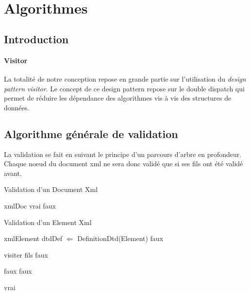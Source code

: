 \section{Algorithmes}

\subsection*{Introduction}
\paragraph{Visitor}
La totalité de notre conception repose en grande partie sur l'utilisation du \textit{design pattern visitor}. Le concept de ce design pattern repose sur le double dispatch qui permet de réduire les dépendance des algorithmes vis à vis des structures de données.\\


\subsection{Algorithme générale de validation}
La validation se fait en suivant le principe d'un parcours d'arbre en profondeur. Chaque noeud du document xml ne sera donc validé que si ses fils ont été validé avant.




\begin{algorithm}
\caption{Validation d'un Document Xml}
\begin{algorithmic}
\REQUIRE xmlDoc 
       \RETURN vrai
\ELSE
        \RETURN faux
\ENDIF 
\end{algorithmic}
\end{algorithm}

\begin{algorithm}
\caption{Validation d'un Element Xml}
\begin{algorithmic}
\REQUIRE xmlElement 
\STATE dtdDef $\Leftarrow$ DefinitionDtd(Element)
       \RETURN faux
\ELSE

		\STATE visiter fils
			\RETURN faux
		\ENDIF
	\ENDFOR
	
			\RETURN faux
		\ENDIF
	\ENDFOR
		\RETURN faux
	\ENDIF

        \RETURN vrai
\ENDIF 
\end{algorithmic}
\end{algorithm}

